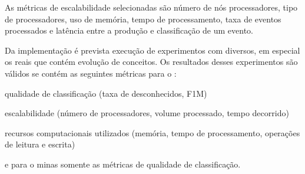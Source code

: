 As métricas de escalabilidade selecionadas são número de nós processadores, tipo
de processadores, uso de memória, tempo de processamento, taxa de eventos
processados e latência entre a produção e classificação de um evento.

Da implementação \mfog é prevista execução de experimentos com \datasets
diversos, em especial os \datasets reais que contém evolução de conceitos.
Os resultados desses experimentos são válidos se contém as seguintes métricas
para o \mfog: \begin{enumerate*}[label={\alph*)}]
  \item qualidade de classificação (taxa de desconhecidos, F1M)
  \item escalabilidade (número de processadores, volume processado, tempo decorrido)
  \item recursos computacionais utilizados (memória, tempo de processamento, operações de leitura e escrita)
\end{enumerate*}
e para o minas somente as métricas de qualidade de classificação.





